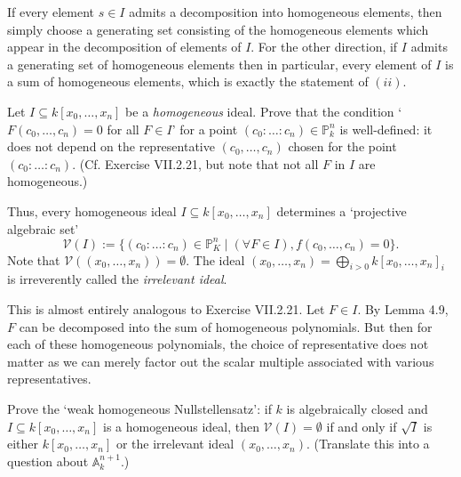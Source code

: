 \documentclass[../../master.tex]{subfiles}
\begin{document}
\begin{solution}
    If every element $s \in I$ admits a decomposition into homogeneous elements, then simply choose a generating set consisting of the homogeneous elements which appear in the decomposition of elements of $I$.
    For the other direction, if $I$ admits a generating set of homogeneous elements then in particular, every element of $I$ is a sum of homogeneous elements, which is exactly the statement of $(ii)$.
\end{solution}

\begin{problem}
    Let $I \subseteq k[x_0, \ldots, x_n]$ be a \textit{homogeneous} ideal.
    Prove that the condition ` $F(c_0, \ldots, c_n) = 0$ for all $F \in I$' for a point $(c_0 : \ldots : c_n) \in \mathbb{P}_k^{n}$ is well-defined:
    it does not depend on the representative $(c_0, \ldots, c_n)$ chosen for the point $(c_0 : \ldots : c_n)$.
    (Cf. Exercise VII.2.21, but note that not all $F$ in $I$ are homogeneous.)

    Thus, every homogeneous ideal $I \subseteq k[x_0, \ldots, x_n]$ determines a `projective algebraic set'
    \[
    \mathscr{V}(I) := \{(c_0 : \ldots : c_n) \in \mathbb{P}_K^{n} \mid (\forall F \in I), f(c_0, \ldots, c_n) = 0\}.
    \]
    Note that $\mathscr{V}((x_0, \ldots, x_n)) = \emptyset$.
    The ideal $(x_0, \ldots, x_n) = \bigoplus_{i > 0} k[x_0, \ldots, x_n]_i$ is irreverently called the \textit{irrelevant ideal}.
\end{problem}

\begin{solution}
    This is almost entirely analogous to Exercise VII.2.21.
    Let $F \in I$.
    By Lemma 4.9, $F$ can be decomposed into the sum of homogeneous polynomials.
    But then for each of these homogeneous polynomials, the choice of representative does not matter as we can merely factor out the scalar multiple associated with various representatives.
\end{solution}

\begin{problem}
    Prove the `weak homogeneous Nullstellensatz':
    if $k$ is algebraically closed and $I \subseteq k[x_0, \ldots, x_n]$ is a homogeneous ideal, then $\mathscr{V}(I) = \emptyset$ if and only if $\sqrt{I}$ is either $k[x_0, \ldots, x_n]$ or the irrelevant ideal $(x_0, \ldots, x_n)$.
    (Translate this into a question about $\mathbb{A}_k^{n+1}$.)
\end{problem}
\end{document}
